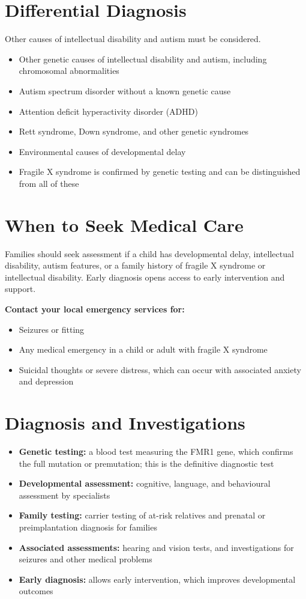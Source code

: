 \section*{Differential Diagnosis}
Other causes of intellectual disability and autism must be considered.
\begin{itemize}
    \item Other genetic causes of intellectual disability and autism, including chromosomal abnormalities
    \item Autism spectrum disorder without a known genetic cause
    \item Attention deficit hyperactivity disorder (ADHD)
    \item Rett syndrome, Down syndrome, and other genetic syndromes
    \item Environmental causes of developmental delay
    \item Fragile X syndrome is confirmed by genetic testing and can be distinguished from all of these
\end{itemize}

\section*{When to Seek Medical Care}
Families should seek assessment if a child has developmental delay, intellectual disability, autism features, or a family history of fragile X syndrome or intellectual disability. Early diagnosis opens access to early intervention and support.

\textbf{Contact your local emergency services for:}
\begin{itemize}
    \item Seizures or fitting
    \item Any medical emergency in a child or adult with fragile X syndrome
    \item Suicidal thoughts or severe distress, which can occur with associated anxiety and depression
\end{itemize}

\section*{Diagnosis and Investigations}
\begin{itemize}
    \item \textbf{Genetic testing:} a blood test measuring the FMR1 gene, which confirms the full mutation or premutation; this is the definitive diagnostic test
    \item \textbf{Developmental assessment:} cognitive, language, and behavioural assessment by specialists
    \item \textbf{Family testing:} carrier testing of at-risk relatives and prenatal or preimplantation diagnosis for families
    \item \textbf{Associated assessments:} hearing and vision tests, and investigations for seizures and other medical problems
    \item \textbf{Early diagnosis:} allows early intervention, which improves developmental outcomes
\end{itemize}

